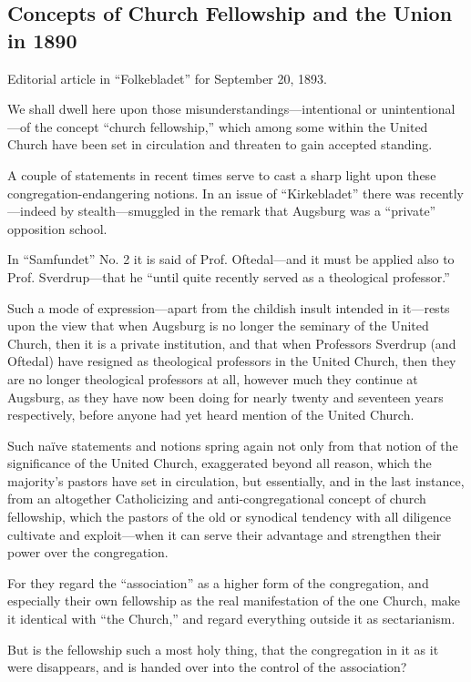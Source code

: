 
\subsection{Concepts of Church Fellowship and the Union in 1890}

Editorial article in “Folkebladet” for September 20, 1893.

We shall dwell here upon those misunderstandings—intentional or unintentional—of the concept “church fellowship,” which among some within the United Church have been set in circulation and threaten to gain accepted standing.

A couple of statements in recent times serve to cast a sharp light upon these congregation-endangering notions. In an issue of “Kirkebladet” there was recently—indeed by stealth—smuggled in the remark that Augsburg was a “private” opposition school.

In “Samfundet” No. 2 it is said of Prof. Oftedal—and it must be applied also to Prof. Sverdrup—that he “until quite recently served as a theological professor.”

Such a mode of expression—apart from the childish insult intended in it—rests upon the view that when Augsburg is no longer the seminary of the United Church, then it is a private institution, and that when Professors Sverdrup (and Oftedal) have resigned as theological professors in the United Church, then they are no longer theological professors at all, however much they continue at Augsburg, as they have now been doing for nearly twenty and seventeen years respectively, before anyone had yet heard mention of the United Church.

Such naïve statements and notions spring again not only from that notion of the significance of the United Church, exaggerated beyond all reason, which the majority’s pastors have set in circulation, but essentially, and in the last instance, from an altogether Catholicizing and anti-congregational concept of church fellowship, which the pastors of the old or synodical tendency with all diligence cultivate and exploit—when it can serve their advantage and strengthen their power over the congregation.

For they regard the “association” as a higher form of the congregation, and especially their own fellowship as the real manifestation of the one Church, make it identical with “the Church,” and regard everything outside it as sectarianism.

But is the fellowship such a most holy thing, that the congregation in it as it were disappears, and is handed over into the control of the association?

